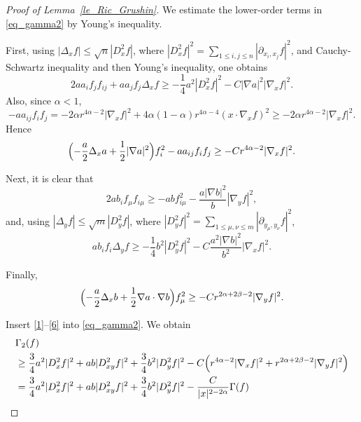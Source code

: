 \documentclass[12pt]{amsart}
\theoremstyle{plain}
\theoremstyle{definition}
\numberwithin{equation}{section}
\begin{document}
\begin{proof}[Proof of Lemma~\ref{le_Ric_Grushin}]
We estimate the lower-order terms in \eqref{eq_gamma2} by Young's inequality.

First, using $|\Delta_x f|\le \sqrt n|D_x^2 f|$, where $|D_x^2f|^2 = \sum_{1\le i,j\le n}|\partial_{x_i,x_j}f|^2$, and Cauchy-Schwartz inequality and then Young's inequality, one obtains
\begin{equation}\label{1}
    2a a_i f_j f_{ij} + a a_j f_j \Delta_x f \ge
-\frac14 a^2|D_x^2 f|^2-C|\nabla a|^2|\nabla_x f|^2.
\end{equation}
Also, since $\alpha<1$,
\begin{equation}\label{2}
-a a_{ij}f_i f_j = -2\alpha r^{4\alpha-2}|\nabla_x f|^2 + 4\alpha(1-\alpha)r^{4\alpha-4}(x\cdot \nabla_x f)^2
\ge -2\alpha r^{4\alpha-2}|\nabla_x f|^2.
\end{equation}
Hence
\begin{equation}\label{3}
    \Bigl(-\frac a2 \Delta_x a + \frac12| \nabla a|^2\Bigr)f_i^2-a a_{ij}f_i f_j \ge
-C r^{4\alpha-2}|\nabla_x f|^2.
\end{equation}

Next, it is clear that
\begin{equation}\label{4}
    2a b_i f_\mu f_{i\mu}
\ge
-a b f_{i\mu}^2-\frac{a|\nabla b|^2}{b} |\nabla_y f|^2,
\end{equation}
and, using $|\Delta_y f|\le \sqrt m|D_y^2 f|$, where $|D_y^2f|^2 = \sum_{1\le \mu,\nu\le m}|\partial_{y_\mu,y_\nu}f|^2$, 
\begin{equation}\label{5}
    a b_i f_i \Delta_y f \ge -\frac14 b^2|D_y^2 f|^2 - C \frac{a^2|\nabla b|^2}{b^2}|\nabla_x f|^2.
\end{equation}

Finally,
\begin{equation}\label{6}
    \Bigl( -\frac a2 \Delta_x b + \frac12 \nabla a \cdot \nabla b \Bigr) f_\mu^2 \ge
 -  C r^{2\alpha+2\beta-2}|\nabla_y f|^2.
\end{equation}

Insert \eqref{1}--\eqref{6} into \eqref{eq_gamma2}. 
We obtain
\begin{align}\label{7}
{}&\Gamma_2(f)\\ \nonumber
&\ge \frac34 a^2|D_x^2 f|^2 + ab|D_{xy}^2 f|^2 + \frac34 b^2|D_y^2 f|^2 - C \Bigl(r^{4\alpha-2}|\nabla_x f|^2 + r^{2\alpha+2\beta-2}|\nabla_y f|^2\Bigr)\\ \nonumber
&= \frac34 a^2|D_x^2 f|^2 + ab|D_{xy}^2 f|^2 + \frac34 b^2|D_y^2 f|^2 -\frac{C}{|x|^{2-2\alpha}}\Gamma(f)
\end{align}


\end{proof}
\end{document}
